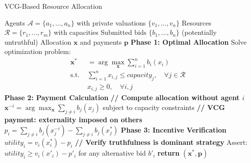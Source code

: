 \begin{algorithm}[htbp]
\caption{VCG-Based Resource Allocation}
\label{alg:vcg_allocation}
\begin{algorithmic}[1]
\REQUIRE Agents $\mathcal{A} = \{a_1, ..., a_n\}$ with private valuations $\{v_1, ..., v_n\}$
\REQUIRE Resources $\mathcal{R} = \{r_1, ..., r_m\}$ with capacities
\REQUIRE Submitted bids $\{b_1, ..., b_n\}$ (potentially untruthful)
\ENSURE Allocation $\mathbf{x}$ and payments $\mathbf{p}$
\STATE \textbf{Phase 1: Optimal Allocation}
\STATE Solve optimization problem:
\begin{align}
\mathbf{x}^* &= \arg\max_{\mathbf{x}} \sum_{i=1}^n b_i(x_i)\\
\text{s.t. } &\sum_{i=1}^n x_{i,j} \leq capacity_j, \quad \forall j \in \mathcal{R}\\
&x_{i,j} \geq 0, \quad \forall i,j
\end{align}
\STATE \textbf{Phase 2: Payment Calculation}
    \STATE \textbf{// Compute allocation without agent $i$}
    \STATE $\mathbf{x}^{-i} = \arg\max_{\mathbf{x}} \sum_{j \neq i} b_j(x_j)$ subject to capacity constraints
    \STATE \textbf{// VCG payment: externality imposed on others}
    \STATE $p_i = \sum_{j \neq i} b_j(x^{-i}_j) - \sum_{j \neq i} b_j(x^*_j)$
\ENDFOR
\STATE \textbf{Phase 3: Incentive Verification}
    \STATE $utility_i = v_i(x^*_i) - p_i$
    \STATE \textbf{// Verify truthfulness is dominant strategy}
    \STATE Assert: $utility_i \geq v_i(x'_i) - p'_i$ for any alternative bid $b'_i$
\ENDFOR
\STATE \textbf{return} $(\mathbf{x}^*, \mathbf{p})$
\end{algorithmic}
\end{algorithm}

